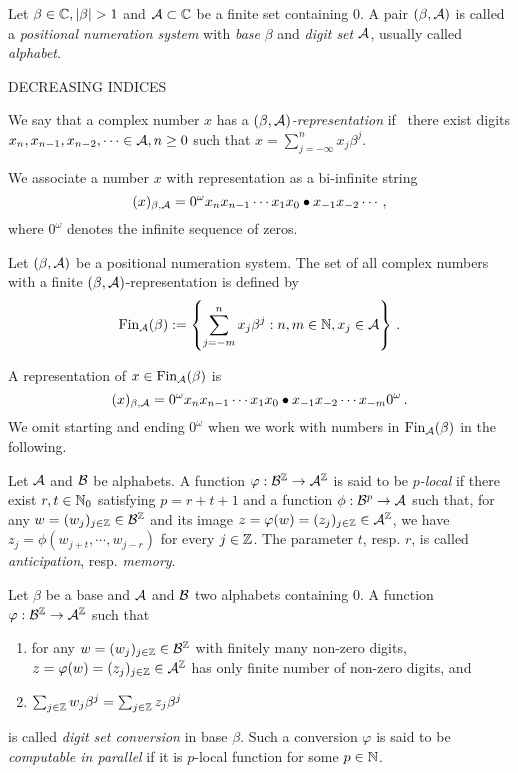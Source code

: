 
\begin{defn}
  Let $\beta \in \CC, |\beta|>1$ and $\mathcal{A} \subset \mathbb{C}$ be a finite set containing 0. A pair $(\beta, \mathcal{A})$ is called a \emph{positional numeration system} with \emph{base} $\beta$ and \emph{digit set} $\mathcal{A}$, usually called \emph{alphabet}.
\end{defn}
DECREASING INDICES

\begin{defn}
  We say that a complex number $x$ has a \emph{$(\beta, \mathcal{A})$-representation} if~ there exist digits $x_n,x_{n-1}, x_{n-2},\dots \in\mathcal{A}, n\geq 0$ such that $x=\sum_{j=-\infty}^n x_j \beta^j$.
\end{defn}
We associate a number $x$ with representation as a bi-infinite string 
  $$
    (x)_{\beta,\mathcal{A}}=0^\omega x_n x_{n-1}\cdots x_1 x_0 \bullet x_{-1} x_{-2} \cdots\,,
  $$
  where $0^\omega$ denotes the infinite sequence of zeros.

\begin{defn}
Let $(\beta, \mathcal{A})$ be a positional numeration system. The set of all complex numbers with a finite $(\beta, \mathcal{A})$-representation is defined by
$$
    \text{Fin}_{\mathcal{A}}(\beta):=\left\{\sum_{j=-m}^n x_j \beta^j : n, m \in \mathbb{N}, x_j \in \mathcal{A} \right\}\,.
$$
\end{defn}
A representation of $x\in\text{Fin}_{\mathcal{A}}(\beta)$ is 
$$
(x)_{\beta,\mathcal{A}}= 0^\omega x_n x_{n-1}\cdots x_1 x_0 \bullet x_{-1} x_{-2} \cdots x_{-m} 0^\omega\,.
$$ 
We omit starting and ending $0^\omega$ when we work with numbers in $\text{Fin}_{\mathcal{A}}(\beta)$ in the following.
\begin{defn}
Let $\mathcal{A}$ and $\mathcal{B}$ be alphabets. A function $\varphi:\mathcal{B}^{\mathbb{Z}} \rightarrow \mathcal{A}^{\mathbb{Z}}$ is said to be \emph{$p$-local} if there exist $r,t\in\mathbb{N}_0$ satisfying $p=r+t+1$ and a function $\phi: \mathcal{B}^p \rightarrow \mathcal{A}$ such that, for any $w=(w_j)_{j\in\mathbb{Z}}\in\mathcal{B}^{\mathbb{Z}}$ and its image $z=\varphi(w)=(z_j)_{j\in\mathbb{Z}}\in\mathcal{A}^{\mathbb{Z}}$, we have $z_j=\phi(w_{j+t},\cdots,w_{j-r})$ for every $j\in\mathbb{Z}$. The parameter $t$, resp. $r$, is called \emph{anticipation}, resp. \emph{memory}.
\end{defn}
  
\begin{defn}
Let $\beta$ be a base and $\mathcal{A}$ and $\mathcal{B}$ two alphabets containing 0. A function $\varphi:\mathcal{B}^{\mathbb{Z}}\rightarrow \mathcal{A}^{\mathbb{Z}}$ such that
  \begin{enumerate}
      \item for any $w=(w_j)_{j\in\mathbb{Z}}\in\mathcal{B}^{\mathbb{Z}}$ with finitely many non-zero digits, $z=\varphi(w)=(z_j)_{j\in\mathbb{Z}}\in\mathcal{A}^{\mathbb{Z}}$ has only finite number of non-zero digits, and
      \item $\sum_{j\in\mathbb{Z}} w_j \beta^j= \sum_{j\in\mathbb{Z}} z_j \beta^j$
  \end{enumerate}
  is called \emph{digit set conversion} in base $\beta$. Such a conversion $\varphi$ is said to be \emph{computable in parallel} if it is $p$-local function for some $p\in\mathbb{N}$. 
\end{defn}



